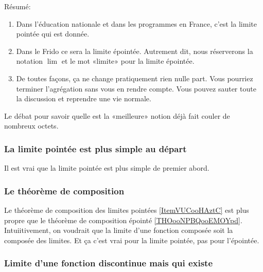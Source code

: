 Résumé:
\begin{enumerate}
	\item
	      Dans l'éducation nationale et dans les programmes en France, c'est la limite pointée qui est donnée.
	\item
	      Dans le Frido ce sera la limite épointée. Autrement dit, nous réserverons la notation \( \lim\) et le mot «limite» pour la limite épointée.
	\item
	      De toutes façons, ça ne change pratiquement rien nulle part. Vous pourriez terminer l'agrégation sans vous en rendre compte. Vous pouvez sauter toute la discussion et reprendre une vie normale.
\end{enumerate}

Le débat pour savoir quelle est la «meilleure» notion déjà fait couler de nombreux octets\cite{BIBooKNWHooBRoxme,BIBooNUKAooVMqppa,BIBooDILKooUcmUVD,BIBooJDPPooVONaQV,BIBooUIAFooHqKjQh}.


\subsubsection{La limite pointée est plus simple au départ}

Il est vrai que la limite pointée est plus simple de premier abord.

\subsubsection{Le théorème de composition}

Le théorème de composition des limites pointées \ref{ItemVUCooHAztC} est plus propre que le théorème de composition épointé \ref{THOooNPBQooEMOYpd}. Intuiitivement, on voudrait que la limite d'une fonction composée soit la composée des limites. Et ça c'est vrai pour la limite pointée, pas pour l'épointée.

\subsubsection{Limite d'une fonction discontinue mais qui existe}

